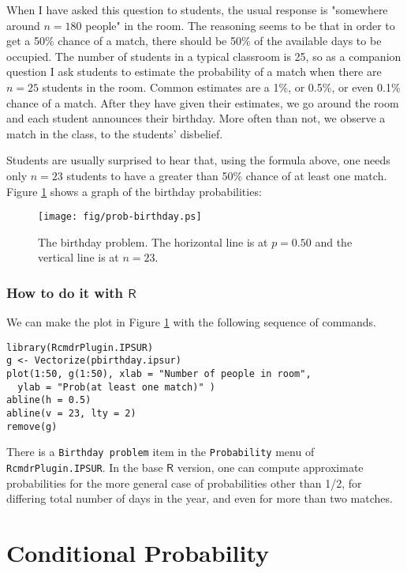 When I have asked this question to students, the usual response is
"somewhere around \(n=180\) people" in the room. The reasoning seems
to be that in order to get a 50\% chance of a match, there should be
50\% of the available days to be occupied. The number of students in a
typical classroom is 25, so as a companion question I ask students to
estimate the probability of a match when there are \(n=25\) students
in the room. Common estimates are a 1\%, or 0.5\%, or even 0.1\% chance
of a match. After they have given their estimates, we go around the
room and each student announces their birthday. More often than not,
we observe a match in the class, to the students' disbelief.

Students are usually surprised to hear that, using the formula above,
one needs only \(n=23\) students to have a greater than 50\% chance of
at least one match. Figure \ref{fig-birthday} shows a graph of the birthday
probabilities:

\begin{figure}[ht!]
\centering
\texttt{[image: fig/prob-birthday.ps]}
\caption[The birthday problem]{\label{fig-birthday}\small The birthday problem. The horizontal line is at \(p=0.50\) and the vertical line is at \(n=23\).}
\end{figure}

\subsubsection{How to do it with \(\mathsf{R}\)}
\label{sec-4-5-2-3}

We can make the plot in Figure \ref{fig-birthday} with the following
sequence of commands.

\begin{verbatim}
library(RcmdrPlugin.IPSUR)
g <- Vectorize(pbirthday.ipsur)
plot(1:50, g(1:50), xlab = "Number of people in room", 
  ylab = "Prob(at least one match)" )
abline(h = 0.5)
abline(v = 23, lty = 2)
remove(g)
\end{verbatim}

There is a \texttt{Birthday problem} item in the \texttt{Probability} menu of
\texttt{RcmdrPlugin.IPSUR}. In the base \(\mathsf{R}\) version, one can
compute approximate probabilities for the more general case of
probabilities other than 1/2, for differing total number of days in
the year, and even for more than two matches.

\section{Conditional Probability}
\label{sec-4-6}

